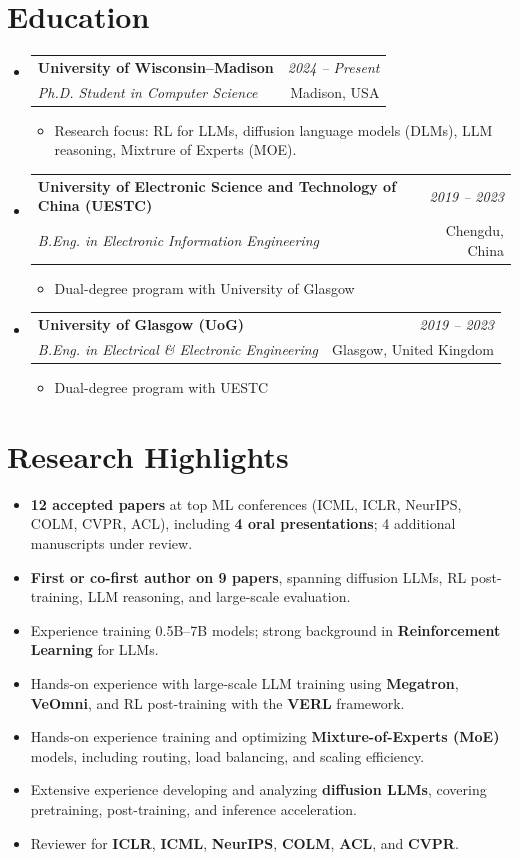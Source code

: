 \documentclass[a4paper,11pt]{article}
\makeatletter
\newcommand{\resumeSubheading}[4]{
\vspace{0.5mm}\item
    \begin{tabular*}{0.98\textwidth}[t]{l@{\extracolsep{\fill}}r}
        \textbf{#1} & \textit{\footnotesize{#4}} \\
        \textit{\footnotesize{#3}} &  \footnotesize{#2}\\
    \end{tabular*}
    \vspace{-2.4mm}
}
\newcommand{\resumeSubHeadingListStart}{\begin{itemize}[leftmargin=*,labelsep=1mm]}
\newcommand{\resumeItemListStart}{\begin{itemize}[leftmargin=*,labelsep=1mm,itemsep=0.5mm]}
\newcommand{\resumeSubHeadingListEnd}{\end{itemize}\vspace{2mm}}
\newcommand{\resumeItemListEnd}{\end{itemize}\vspace{-2mm}}
\makeatother
\begin{document}
\section{\textbf{Education}}
\vspace{-0.4mm}
\resumeSubHeadingListStart

\resumeSubheading
    {University of Wisconsin--Madison}{Madison, USA}
    {Ph.D. Student in Computer Science}{2024 -- Present}
\resumeItemListStart
    \item Research focus: RL for LLMs, diffusion language models (DLMs), LLM reasoning, Mixtrure of Experts (MOE).
\resumeItemListEnd


\resumeSubheading
{University of Electronic Science and Technology of China (UESTC)}{Chengdu, China}
{B.Eng. in Electronic Information Engineering}{2019 -- 2023}
\resumeItemListStart
\item Dual-degree program with University of Glasgow
\resumeItemListEnd

\resumeSubheading
{University of Glasgow (UoG)}{Glasgow, United Kingdom}
{B.Eng. in Electrical \& Electronic Engineering}{2019 -- 2023}
\resumeItemListStart
\item Dual-degree program with UESTC
\resumeItemListEnd

\resumeSubHeadingListEnd
\vspace{-6mm}

\section{\textbf{Research Highlights}}
\vspace{-0.5mm}
\small{
\begin{itemize}[leftmargin=*,itemsep=3pt]
    \item \textbf{12 accepted papers} at top ML conferences (ICML, ICLR, NeurIPS, COLM, CVPR, ACL), including \textbf{4 oral presentations}; 4 additional manuscripts under review.
    \item \textbf{First or co-first author on 9 papers}, spanning diffusion LLMs, RL post-training, LLM reasoning, and large-scale evaluation.
    \item Experience training 0.5B--7B models; strong background in \textbf{Reinforcement Learning} for LLMs.
    \item Hands-on experience with large-scale LLM training using \textbf{Megatron}, \textbf{VeOmni}, and RL post-training with the \textbf{VERL} framework.
    \item Hands-on experience training and optimizing \textbf{Mixture-of-Experts (MoE)} models, including routing, load balancing, and scaling efficiency.
    \item Extensive experience developing and analyzing \textbf{diffusion LLMs}, covering pretraining, post-training, and inference acceleration.
    \item Reviewer for \textbf{ICLR}, \textbf{ICML}, \textbf{NeurIPS}, \textbf{COLM}, \textbf{ACL}, and \textbf{CVPR}.
\end{itemize}
}
\end{document}
